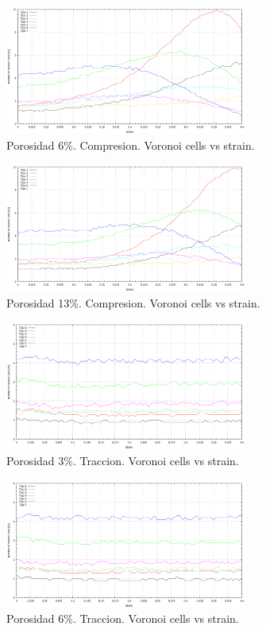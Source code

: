 \documentclass[10pt, oneside]{article} %
\begin{document}
\begin{figure}[H]
\centering
\includegraphics[width=8cm]{Figures/Porosidad/Porosidad_6_noVoronoi_strain.png}
\caption{Porosidad 6\%. Compresion. Voronoi cells vs strain.}
\end{figure}

\begin{figure}[H]
\centering
\includegraphics[width=8cm]{Figures/Porosidad/Porosidad_13_noVoronoi_strain.png}
\caption{Porosidad 13\%. Compresion. Voronoi cells vs strain.}
\end{figure}

\begin{figure}[H]
\centering
\includegraphics[width=8cm]{Figures/Porosidad/Porosidad_3_noVoronoi_strain_trac.png}
\caption{Porosidad 3\%. Traccion. Voronoi cells vs strain.}
\end{figure}

\begin{figure}[H]
\centering
\includegraphics[width=8cm]{Figures/Porosidad/Porosidad_6_noVoronoi_strain_trac.png}
\caption{Porosidad 6\%. Traccion. Voronoi cells vs strain.}
\end{figure}
\end{document}
